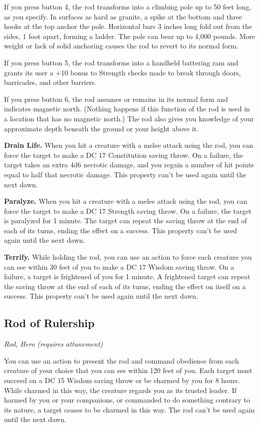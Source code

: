 If you press button 4, the rod transforms into a climbing pole up to 50 feet long, as you specify. In surfaces as hard as granite, a spike at the bottom and three hooks at the top anchor the pole. Horizontal bars 3 inches long fold out from the sides, 1 foot apart, forming a ladder. The pole can bear up to 4,000 pounds. More weight or lack of solid anchoring causes the rod to revert to its normal form.

If you press button 5, the rod transforms into a handheld battering ram and grants its user a +10 bonus to Strength checks made to break through doors, barricades, and other barriers.

If you press button 6, the rod assumes or remains in its normal form and indicates magnetic north. (Nothing happens if this function of the rod is used in a location that has no magnetic north.) The rod also gives you knowledge of your approximate depth beneath the ground or your height above it.

\textbf{Drain Life.} When you hit a creature with a melee attack using the
rod, you can force the target to make a DC 17 Constitution saving throw. On a failure, the target takes an extra 4d6 necrotic damage, and you regain a number of hit points equal to half that necrotic damage. This property can't be used again until the next dawn.

\textbf{Paralyze.} When you hit a creature with a melee attack using the rod, you can force the target to make a DC 17 Strength saving throw. On a failure, the target is paralyzed for 1 minute. The target can repeat the saving throw at the end of each of its turns, ending the effect on a success. This property can't be used again until the next dawn.

\textbf{Terrify.} While holding the rod, you can use an action to force each creature you can see within 30 feet of you to make a DC 17 Wisdom saving throw. On a failure, a target is frightened of you for 1 minute. A frightened target can repeat the saving throw at the end of each of its turns, ending the effect on itself on a success. This property can't be used again until the next dawn.

\subsection{Rod of Rulership}
\textit{Rod, Hero (requires attunement)}

You can use an action to present the rod and command obedience from each creature of your choice that you can see within 120 feet of you. Each target must succeed on a DC 15 Wisdom saving throw or be charmed by you for 8 hours. While charmed in this way, the creature regards you as its
trusted leader. If harmed by you or your companions, or commanded to do something contrary to its nature, a target ceases to be charmed in this way. The rod can't be used again until the next dawn.

